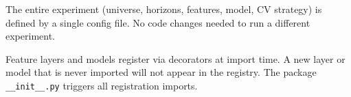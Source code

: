 
\begin{keyidea}
The entire experiment (universe, horizons, features, model, CV strategy) is defined by a single config file.
No code changes needed to run a different experiment.
\end{keyidea}

\begin{warning}
Feature layers and models register via decorators at import time.
A new layer or model that is never imported will not appear in the registry.
The package \texttt{\_\_init\_\_.py} triggers all registration imports.
\end{warning}
